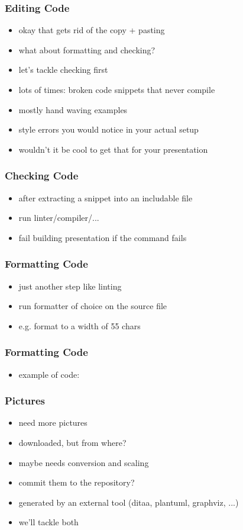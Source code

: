 \documentclass{beamer}
\begin{document}
\begin{frame}
  \frametitle{Editing Code}
  \begin{itemize}
  \item okay that gets rid of the copy + pasting
  \item what about formatting and checking?
  \item let's tackle checking first
  \item lots of times: broken code snippets that never compile
  \item mostly hand waving examples
  \item style errors you would notice in your actual setup
  \item wouldn't it be cool to get that for your presentation
  \end{itemize}
\end{frame}

\begin{frame}
  \frametitle{Checking Code}
  \begin{itemize}
  \item after extracting a snippet into an includable file
  \item run linter/compiler/...
  \item fail building presentation if the command fails
  \end{itemize}
\end{frame}

\begin{frame}
  \frametitle{Formatting Code}
  \begin{itemize}
  \item just another step like linting
  \item run formatter of choice on the source file
  \item e.g. format to a width of 55 chars
  \end{itemize}
\end{frame}

\begin{frame}
  \frametitle{Formatting Code}
  \begin{itemize}
  \item example of code:
  \end{itemize}
\end{frame}

\begin{frame}
  \frametitle{Pictures}
  \begin{itemize}
  \item need more pictures
  \item downloaded, but from where?
  \item maybe needs conversion and scaling
  \item commit them to the repository?
  \item generated by an external tool (ditaa, plantuml, graphviz, ...)
  \item we'll tackle both
  \end{itemize}
\end{frame}
\end{document}
